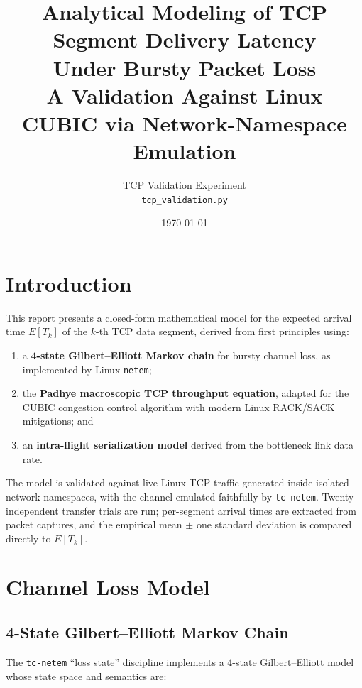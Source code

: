 \documentclass[11pt,letterpaper]{article}
\title{%
    \textbf{Analytical Modeling of TCP Segment Delivery Latency\\
    Under Bursty Packet Loss}\\[0.5em]
    \large A Validation Against Linux CUBIC via Network-Namespace Emulation
}
\author{%
    TCP Validation Experiment\\
    \texttt{tcp\_validation.py}
}
\date{\today}
\begin{document}
\maketitle
\tableofcontents
\newpage

\section{Introduction}
\label{sec:intro}

This report presents a closed-form mathematical model for the expected arrival
time $E[T_k]$ of the $k$-th TCP data segment, derived from first principles
using:

\begin{enumerate}
    \item a \textbf{4-state Gilbert--Elliott Markov chain} for bursty channel
          loss, as implemented by Linux \texttt{netem};
    \item the \textbf{Padhye macroscopic TCP throughput equation}, adapted for
          the CUBIC congestion control algorithm with modern Linux RACK/SACK
          mitigations; and
    \item an \textbf{intra-flight serialization model} derived from the
          bottleneck link data rate.
\end{enumerate}

The model is validated against live Linux TCP traffic generated inside isolated
network namespaces, with the channel emulated faithfully by \texttt{tc-netem}.
Twenty independent transfer trials are run; per-segment arrival times are
extracted from packet captures, and the empirical mean $\pm$ one standard
deviation is compared directly to $E[T_k]$.

\section{Channel Loss Model}
\label{sec:channel}

\subsection{4-State Gilbert--Elliott Markov Chain}

The \texttt{tc-netem} ``loss state'' discipline implements a 4-state
Gilbert--Elliott model~\cite{gilbert1960capacity} whose state space and
semantics are:
\end{document}
